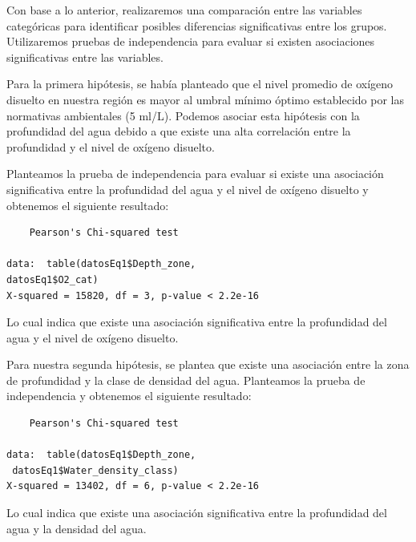 
Con base a lo anterior, realizaremos una comparación entre las variables categóricas para identificar posibles diferencias significativas entre los grupos. Utilizaremos pruebas de independencia para evaluar si existen asociaciones significativas entre las variables.

Para la primera hipótesis, se había planteado que el nivel promedio de oxígeno disuelto en nuestra región es mayor al umbral mínimo óptimo establecido por las normativas ambientales (5 ml/L). Podemos asociar esta hipótesis con la profundidad del agua debido a que existe una alta correlación entre la profundidad y el nivel de oxígeno disuelto. 

Planteamos la prueba de independencia para evaluar si existe una asociación significativa entre la profundidad del agua y el nivel de oxígeno disuelto y obtenemos el siguiente resultado:

\begin{verbatim}
	Pearson's Chi-squared test

data:  table(datosEq1$Depth_zone, 
datosEq1$O2_cat)
X-squared = 15820, df = 3, p-value < 2.2e-16
\end{verbatim}

Lo cual indica que existe una asociación significativa entre la profundidad del agua y el nivel de oxígeno disuelto.

Para nuestra segunda hipótesis, se plantea que existe una asociación entre la zona de profundidad y la clase de densidad del agua. Planteamos la prueba de independencia y obtenemos el siguiente resultado:

\begin{verbatim}
	Pearson's Chi-squared test

data:  table(datosEq1$Depth_zone,
 datosEq1$Water_density_class)
X-squared = 13402, df = 6, p-value < 2.2e-16
\end{verbatim}

Lo cual indica que existe una asociación significativa entre la profundidad del agua y la densidad del agua.